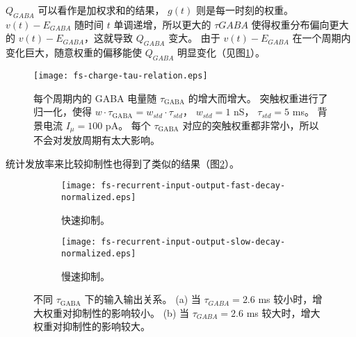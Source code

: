 $Q_{GABA}$ 可以看作是加权求和的结果， $g\left(t\right)$ 则是每一时刻的权重。 $v\left(t\right) - E_{GABA}$ 随时间 $t$ 单调递增，所以更大的 $\tau{GABA}$ 使得权重分布偏向更大的 $v\left(t\right) - E_{GABA}$，这就导致 $Q_{GABA}$ 变大。
由于 $v\left(t\right) - E_{GABA}$ 在一个周期内变化巨大，随意权重的偏移能使 $Q_{GABA}$ 明显变化（见图\ref{figure:fs-neuron-tau-charge}）。 

\begin{figure}
\texttt{[image: fs-charge-tau-relation.eps]}
\caption{每个周期内的 GABA 电量随 $\tau_\text{GABA}$ 的增大而增大。
突触权重进行了归一化，使得 $w \cdot \tau_\text{GABA} = w_{std} \cdot \tau_{std}$， $w_{std} = 1$ nS， $\tau_{std} = 5$ ms。
背景电流 $I_{\mu} = 100$ pA。
每个 $\tau_\text{GABA}$ 对应的突触权重都非常小，所以不会对发放周期有太大影响。}
\label{figure:fs-neuron-tau-charge}
\end{figure}

统计发放率来比较抑制性也得到了类似的结果（图\ref{figure:fs-neuron-inhibition}）。

\begin{figure}
    \begin{subfigure}{0.5\textwidth}
        \texttt{[image: fs-recurrent-input-output-fast-decay-normalized.eps]}
        \caption{快速抑制。}
    \end{subfigure}
    \begin{subfigure}{0.5\textwidth}
        \texttt{[image: fs-recurrent-input-output-slow-decay-normalized.eps]}
        \caption{慢速抑制。}
    \end{subfigure}
\caption{不同 $\tau_\text{GABA}$ 下的输入输出关系。
(a) 当 $\tau_{GABA} = 2.6$ ms 较小时，增大权重对抑制性的影响较小。
(b) 当 $\tau_{GABA} = 2.6$ ms 较大时，增大权重对抑制性的影响较大。}
\label{figure:fs-neuron-inhibition}
\end{figure}

